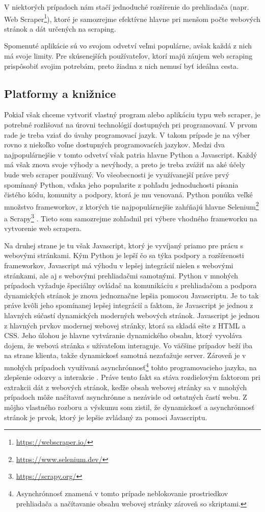 V niektorých prípadoch nám stačí jednoduché rozšírenie do prehliadača (napr. Web Scraper\footnote{\url{https://webscraper.io/}}), ktoré je samozrejme efektívne hlavne pri menšom počte webových stránok a dát určených na scraping. 

Spomenuté aplikácie sú vo svojom odvetví veľmi populárne, avšak každá z nich má svoje limity. Pre skúsenejších používateľov, ktorí majú záujem web scraping prispôsobiť svojim potrebám, preto žiadna z nich nemusí byť ideálna cesta.

\subsection{Platformy a knižnice}

Pokiaľ však chceme vytvoriť vlastný program alebo aplikáciu typu web scraper, je potrebné rozlišovať na úrovni technológií dostupných pri programovaní. V prvom rade je treba vziať do úvahy programovací jazyk. V takom prípade je na výber rovno z niekoľko voľne dostupných programovacích jazykov. Medzi dva najpopulárnejšie v tomto odvetví však patria hlavne Python a Javascript. Každý má však znova svoje výhody a nevýhody, a preto je treba zvážiť na aké účely bude web scraper používaný. Vo všeobecnosti je využívanejší práve prvý spomínaný Python, vďaka jeho popularite z pohľadu jednoduchosti písania čistého kódu, komunity a podpory, ktorá je mu venovaná. Python ponúka veľké množstvo frameworkov, z ktorých tie najpopulárnejšie zahŕňajú hlavne Selenium\footnote{\url{https://www.selenium.dev/}} a Scrapy\footnote{\url{https://scrapy.org/}} \cite{The5Best}. Tieto som samozrejme zohľadnil pri výbere vhodného frameworku na vytvorenie web scrapera.

Na druhej strane je tu však Javascript, ktorý je vyvíjaný priamo pre prácu s webovými stránkami. Kým Python je lepší čo sa týka podpory a rozšírenosti frameworkov, Javascript má výhodu v lepšej integrácií nielen s webovými stránkami, ale aj s webovými prehliadačmi samotnými. Python v mnohých prípadoch vyžaduje špeciálny ovládač na komunikáciu s prehliadačom a podpora dynamických stránok je znova jednoznačne lepšia pomocou Javascriptu. Je to tak práve kvôli jeho spomínanej lepšej integrácií a faktom, že Javascript je jednou z hlavných súčastí dynamických moderných webových stránok. Javascript je jednou z hlavných prvkov modernej webovej stránky, ktorá sa skladá ešte z HTML a CSS. Jeho úlohou je hlavne vytváranie dynamického obsahu, ktorý vyvoláva dojem, že webová stránka s užívateľom interaguje. Vo väčšine prípadov beží iba na strane klienta, takže dynamickosť samotná nezaťažuje server. Zároveň je v mnohých prípadoch využívaná asynchrónnosť\footnote{Asynchrónnosť znamená v tomto prípade neblokovanie prostriedkov prehliadača a načítavanie obsahu webovej stránky zároveň so skriptami.} tohto programovacieho jazyka, na zlepšenie odozvy a interakcie \cite{Javascript}. Práve tento fakt sa stáva rozdielovým faktorom pri extrakcii dát z webových stránok, keďže obsah webovej stránky sa v mnohých prípadoch môže načítavať asynchrónne a nezávisle od ostatných častí webu. Z môjho vlastného rozboru a výskumu som zistil, že dynamickosť a asynchrónnosť stránok je prvok, ktorý je lepšie zvládaný za pomoci Javascriptu.

